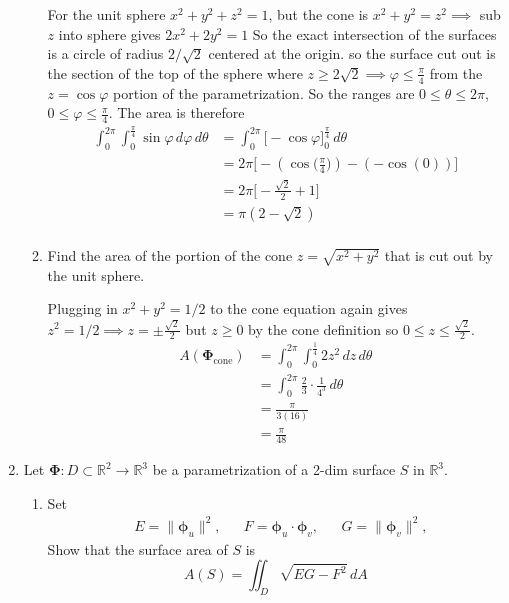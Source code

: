 \documentclass{article}
\newcommand{\norm}[1]{\| #1 \|}
\begin{document}
\begin{enumerate}
\begin{enumerate}
        For the unit sphere $x^2 + y^2 + z^2 = 1$, but the cone is $ x^2 + y^2 = z^2 \implies $ sub $z$ into sphere gives $2x^2 + 2y^2 = 1$
        So the exact intersection of the surfaces is a circle of radius $2/\sqrt{2}$ centered at the origin. so the surface cut out is the section of the top of the sphere where $z \geq 2\sqrt{2} \implies \varphi \leq \frac{\pi}{4}$ from the $z = \cos \varphi$ portion of the parametrization. So the ranges are $0 \leq \theta \leq 2\pi$, $0 \leq \varphi \leq \frac{\pi}{4}$. The area is therefore
        \begin{align*} 
            \int_0^{2\pi} \int_0^{\frac{\pi}{4}} \sin \varphi \, d\varphi \, d\theta &= \int_0^{2\pi} \Big[ -\cos \varphi \Big]_0^{\frac{\pi}{4}} \, d\theta \\
            &= 2\pi \Big[-(\cos\big(\frac{\pi}{4}\big)) - (-\cos(0))\Big] \\
            &= 2\pi \Big[-\frac{\sqrt{2}}{2} + 1\Big] \\
            &= \pi (2 -\sqrt{2} )\\
        \end{align*}

        \item Find the area of the portion of the cone $z = \sqrt{x^2+y^2}$ that is cut out by the unit sphere.
        
        Plugging in $x^2 +y^2 = 1/2$ to the cone equation again gives $z^2 = 1/2 \implies z = \pm \frac{\sqrt{2}}{2}$ but $z \geq 0$ by the cone definition so $0 \leq z \leq \frac{\sqrt{2}}{2}$.
        \begin{align*}
            A(\boldsymbol \Phi_{\text{cone}}) &= \int_0^{2\pi}\int_0^{\frac{1}{4}} 2z^2 \, dz \, d\theta \\
            &= \int_0^{2\pi}\frac{2}{3}\cdot \frac{1}{4^3} \, d\theta \\
            &=\frac{\pi}{3(16)} \\
            &=\frac{\pi}{48}
        \end{align*}
    \end{enumerate}
    \newpage
    \item Let $\boldsymbol \Phi : D \subset \mathbb{R}^2 \rightarrow \mathbb{R}^3$ be a parametrization of a 2-dim surface $S$ in $\mathbb{R}^3$.
    \begin{enumerate}
        \item Set
        \begin{align*}
            & E = \norm{\boldsymbol \phi_u}^2,& &F = \boldsymbol \phi_u \cdot \boldsymbol \phi_v, & & G = \norm{\boldsymbol \phi_v}^2,
        \end{align*} 
        Show that the surface area of $S$ is 
        \[ A(S) = \iint_D \sqrt{EG - F^2}\,dA \]
        

\end{enumerate}
\end{enumerate}
\end{document}
